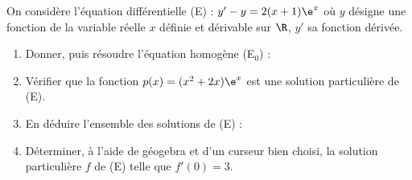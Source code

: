 On considère l’équation différentielle (E) : $y' - y = 2(x + 1)\e^x$ où $y$ désigne une fonction de la variable réelle $x$ définie et dérivable sur $\R$, $y'$ sa fonction dérivée.

\begin{enumerate}
	\item Donner, puis résoudre l'équation homogène (E$_0$) :\sautp
	
	\item Vérifier que la fonction $p(x)=(x^2+2x)\e^{x}$ est une solution particulière de (E).\sautp


	

	
	
	\item En déduire l'ensemble des solutions de (E) : \sautp
	
	\item Déterminer, à l'aide de géogebra et d'un curseur bien choisi, la solution particulière $f$ de (E) telle que $f'(0)=3$.\sautp

    \appelprof
	
	

\end{enumerate}